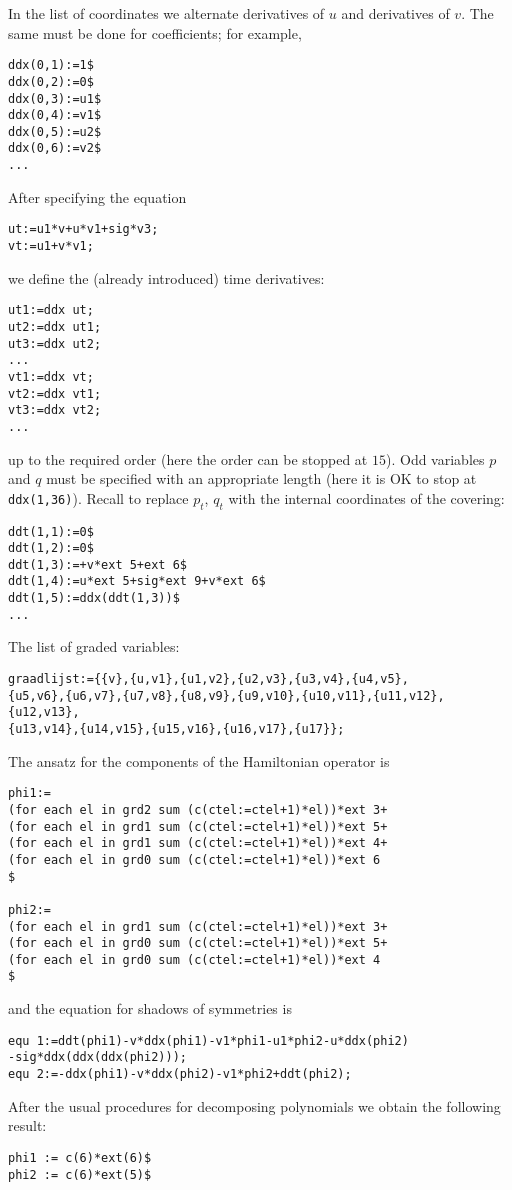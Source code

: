 In the list of coordinates we alternate derivatives of $u$ and derivatives of
$v$. The same must be done for coefficients; for example,
\begin{verbatim}
ddx(0,1):=1$
ddx(0,2):=0$
ddx(0,3):=u1$
ddx(0,4):=v1$
ddx(0,5):=u2$
ddx(0,6):=v2$
...
\end{verbatim}
After specifying the equation
\begin{verbatim}
ut:=u1*v+u*v1+sig*v3;
vt:=u1+v*v1;
\end{verbatim}
we define the (already introduced) time derivatives:
\begin{verbatim}
ut1:=ddx ut;
ut2:=ddx ut1;
ut3:=ddx ut2;
...
vt1:=ddx vt;
vt2:=ddx vt1;
vt3:=ddx vt2;
...
\end{verbatim}
up to the required order (here the order can be stopped at $15$).  Odd
variables $p$ and $q$ must be specified with an appropriate length (here it is
OK to stop at \texttt{ddx(1,36)}). Recall to replace $p_t$, $q_t$ with the
internal coordinates of the covering:
\begin{verbatim}
ddt(1,1):=0$
ddt(1,2):=0$
ddt(1,3):=+v*ext 5+ext 6$
ddt(1,4):=u*ext 5+sig*ext 9+v*ext 6$
ddt(1,5):=ddx(ddt(1,3))$
...
\end{verbatim}
The list of graded variables:
\begin{verbatim}
graadlijst:={{v},{u,v1},{u1,v2},{u2,v3},{u3,v4},{u4,v5},
{u5,v6},{u6,v7},{u7,v8},{u8,v9},{u9,v10},{u10,v11},{u11,v12},{u12,v13},
{u13,v14},{u14,v15},{u15,v16},{u16,v17},{u17}};
\end{verbatim}
The ansatz for the components of the Hamiltonian operator is
\begin{verbatim}
phi1:=
(for each el in grd2 sum (c(ctel:=ctel+1)*el))*ext 3+
(for each el in grd1 sum (c(ctel:=ctel+1)*el))*ext 5+
(for each el in grd1 sum (c(ctel:=ctel+1)*el))*ext 4+
(for each el in grd0 sum (c(ctel:=ctel+1)*el))*ext 6
$

phi2:=
(for each el in grd1 sum (c(ctel:=ctel+1)*el))*ext 3+
(for each el in grd0 sum (c(ctel:=ctel+1)*el))*ext 5+
(for each el in grd0 sum (c(ctel:=ctel+1)*el))*ext 4
$
\end{verbatim}
and the equation for shadows of symmetries is
\begin{verbatim}
equ 1:=ddt(phi1)-v*ddx(phi1)-v1*phi1-u1*phi2-u*ddx(phi2)
-sig*ddx(ddx(ddx(phi2)));
equ 2:=-ddx(phi1)-v*ddx(phi2)-v1*phi2+ddt(phi2);
\end{verbatim}
After the usual procedures for decomposing polynomials we obtain the following
result:
\begin{verbatim}
phi1 := c(6)*ext(6)$
phi2 := c(6)*ext(5)$
\end{verbatim}
